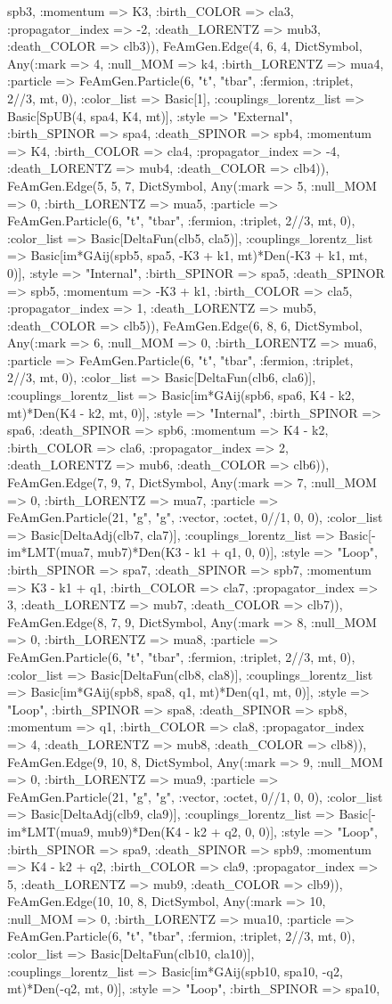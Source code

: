 \documentclass{revtex4}
\begin{document}
\begin{figure}[!htb]
\begin{center}
{spb3, :momentum => K3, :birth_COLOR => cla3, :propagator_index => -2, :death_LORENTZ => mub3, :death_COLOR => clb3)), FeAmGen.Edge(4, 6, 4, Dict{Symbol, Any}(:mark => 4, :null_MOM => k4, :birth_LORENTZ => mua4, :particle => FeAmGen.Particle(6, "t", "tbar", :fermion, :triplet, 2//3, mt, 0), :color_list => Basic[1], :couplings_lorentz_list => Basic[SpUB(4, spa4, K4, mt)], :style => "External", :birth_SPINOR => spa4, :death_SPINOR => spb4, :momentum => K4, :birth_COLOR => cla4, :propagator_index => -4, :death_LORENTZ => mub4, :death_COLOR => clb4)), FeAmGen.Edge(5, 5, 7, Dict{Symbol, Any}(:mark => 5, :null_MOM => 0, :birth_LORENTZ => mua5, :particle => FeAmGen.Particle(6, "t", "tbar", :fermion, :triplet, 2//3, mt, 0), :color_list => Basic[DeltaFun(clb5, cla5)], :couplings_lorentz_list => Basic[im*GAij(spb5, spa5, -K3 + k1, mt)*Den(-K3 + k1, mt, 0)], :style => "Internal", :birth_SPINOR => spa5, :death_SPINOR => spb5, :momentum => -K3 + k1, :birth_COLOR => cla5, :propagator_index => 1, :death_LORENTZ => mub5, :death_COLOR => clb5)), FeAmGen.Edge(6, 8, 6, Dict{Symbol, Any}(:mark => 6, :null_MOM => 0, :birth_LORENTZ => mua6, :particle => FeAmGen.Particle(6, "t", "tbar", :fermion, :triplet, 2//3, mt, 0), :color_list => Basic[DeltaFun(clb6, cla6)], :couplings_lorentz_list => Basic[im*GAij(spb6, spa6, K4 - k2, mt)*Den(K4 - k2, mt, 0)], :style => "Internal", :birth_SPINOR => spa6, :death_SPINOR => spb6, :momentum => K4 - k2, :birth_COLOR => cla6, :propagator_index => 2, :death_LORENTZ => mub6, :death_COLOR => clb6)), FeAmGen.Edge(7, 9, 7, Dict{Symbol, Any}(:mark => 7, :null_MOM => 0, :birth_LORENTZ => mua7, :particle => FeAmGen.Particle(21, "g", "g", :vector, :octet, 0//1, 0, 0), :color_list => Basic[DeltaAdj(clb7, cla7)], :couplings_lorentz_list => Basic[-im*LMT(mua7, mub7)*Den(K3 - k1 + q1, 0, 0)], :style => "Loop", :birth_SPINOR => spa7, :death_SPINOR => spb7, :momentum => K3 - k1 + q1, :birth_COLOR => cla7, :propagator_index => 3, :death_LORENTZ => mub7, :death_COLOR => clb7)), FeAmGen.Edge(8, 7, 9, Dict{Symbol, Any}(:mark => 8, :null_MOM => 0, :birth_LORENTZ => mua8, :particle => FeAmGen.Particle(6, "t", "tbar", :fermion, :triplet, 2//3, mt, 0), :color_list => Basic[DeltaFun(clb8, cla8)], :couplings_lorentz_list => Basic[im*GAij(spb8, spa8, q1, mt)*Den(q1, mt, 0)], :style => "Loop", :birth_SPINOR => spa8, :death_SPINOR => spb8, :momentum => q1, :birth_COLOR => cla8, :propagator_index => 4, :death_LORENTZ => mub8, :death_COLOR => clb8)), FeAmGen.Edge(9, 10, 8, Dict{Symbol, Any}(:mark => 9, :null_MOM => 0, :birth_LORENTZ => mua9, :particle => FeAmGen.Particle(21, "g", "g", :vector, :octet, 0//1, 0, 0), :color_list => Basic[DeltaAdj(clb9, cla9)], :couplings_lorentz_list => Basic[-im*LMT(mua9, mub9)*Den(K4 - k2 + q2, 0, 0)], :style => "Loop", :birth_SPINOR => spa9, :death_SPINOR => spb9, :momentum => K4 - k2 + q2, :birth_COLOR => cla9, :propagator_index => 5, :death_LORENTZ => mub9, :death_COLOR => clb9)), FeAmGen.Edge(10, 10, 8, Dict{Symbol, Any}(:mark => 10, :null_MOM => 0, :birth_LORENTZ => mua10, :particle => FeAmGen.Particle(6, "t", "tbar", :fermion, :triplet, 2//3, mt, 0), :color_list => Basic[DeltaFun(clb10, cla10)], :couplings_lorentz_list => Basic[im*GAij(spb10, spa10, -q2, mt)*Den(-q2, mt, 0)], :style => "Loop", :birth_SPINOR => spa10, }
\end{center}
\end{figure}
\end{document}
